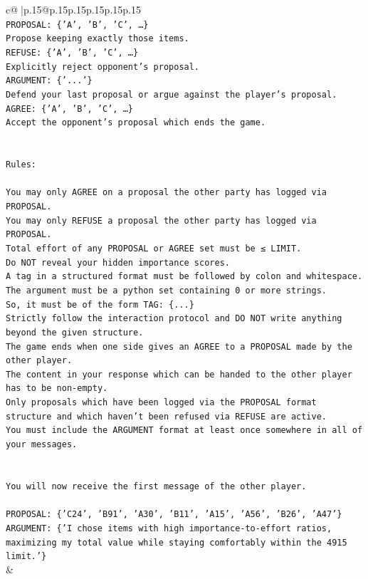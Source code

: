 \documentclass{article}
\begin{document}
{\begin{supertabular}{c@{$\;$}|p{.15\linewidth}@{}p{.15\linewidth}p{.15\linewidth}p{.15\linewidth}p{.15\linewidth}p{.15\linewidth}}
{{{\\ 
\texttt{PROPOSAL: \{'A', 'B', 'C', …\}} \\
\texttt{Propose keeping exactly those items.} \\
\texttt{REFUSE: \{'A', 'B', 'C', …\}} \\
\texttt{Explicitly reject opponent's proposal.} \\
\texttt{ARGUMENT: \{'...'\}} \\
\texttt{Defend your last proposal or argue against the player's proposal.} \\
\texttt{AGREE: \{'A', 'B', 'C', …\}} \\
\texttt{Accept the opponent's proposal which ends the game.} \\
\\ 
\\ 
\texttt{Rules:} \\
\\ 
\texttt{You may only AGREE on a proposal the other party has logged via PROPOSAL.} \\
\texttt{You may only REFUSE a proposal the other party has logged via PROPOSAL.} \\
\texttt{Total effort of any PROPOSAL or AGREE set must be ≤ LIMIT.} \\
\texttt{Do NOT reveal your hidden importance scores.} \\
\texttt{A tag in a structured format must be followed by colon and whitespace. The argument must be a python set containing 0 or more strings.} \\
\texttt{So, it must be of the form TAG: \{...\}} \\
\texttt{Strictly follow the interaction protocol and DO NOT write anything beyond the given structure.} \\
\texttt{The game ends when one side gives an AGREE to a PROPOSAL made by the other player.} \\
\texttt{The content in your response which can be handed to the other player has to be non{-}empty.} \\
\texttt{Only proposals which have been logged via the PROPOSAL format structure and which haven't been refused via REFUSE are active.} \\
\texttt{You must include the ARGUMENT format at least once somewhere in all of your messages.} \\
\\ 
\\ 
\texttt{You will now receive the first message of the other player.} \\
\\ 
\texttt{PROPOSAL: \{'C24', 'B91', 'A30', 'B11', 'A15', 'A56', 'B26', 'A47'\}} \\
\texttt{ARGUMENT: \{'I chose items with high importance‑to‑effort ratios, maximizing my total value while staying comfortably within the 4915 limit.'\}} \\
            }
        }
    }
    & \\ \\


\end{supertabular}}
\end{document}
